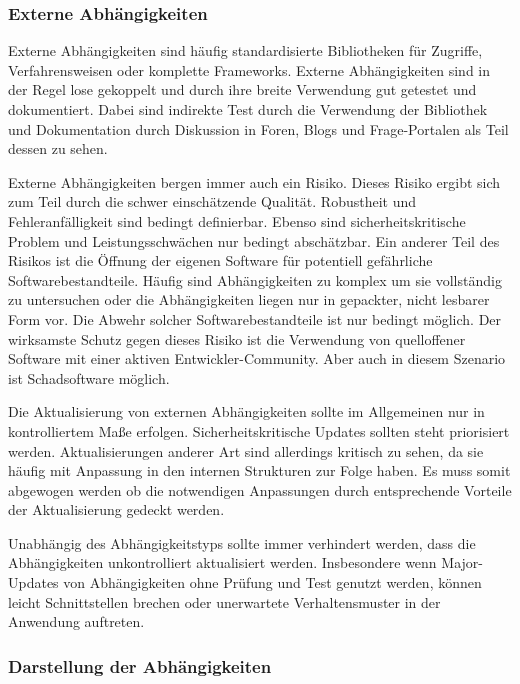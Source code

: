 \subsubsection{Externe Abhängigkeiten}

Externe Abhängigkeiten sind häufig standardisierte Bibliotheken für Zugriffe, Verfahrensweisen oder komplette Frameworks. Externe Abhängigkeiten sind in der Regel lose gekoppelt und durch ihre breite Verwendung gut getestet und dokumentiert. Dabei sind indirekte Test durch die Verwendung der Bibliothek und Dokumentation durch Diskussion in Foren, Blogs und Frage-Portalen als Teil dessen zu sehen. 

Externe Abhängigkeiten bergen immer auch ein Risiko. Dieses Risiko ergibt sich zum Teil durch die schwer einschätzende Qualität. Robustheit und Fehleranfälligkeit sind bedingt definierbar. Ebenso sind sicherheitskritische Problem und Leistungsschwächen nur bedingt abschätzbar. Ein anderer Teil des Risikos ist die Öffnung der eigenen Software für potentiell gefährliche Softwarebestandteile. Häufig sind Abhängigkeiten zu komplex um sie vollständig zu untersuchen oder die Abhängigkeiten liegen nur in gepackter, nicht lesbarer Form vor. Die Abwehr solcher Softwarebestandteile ist nur bedingt möglich. Der wirksamste Schutz gegen dieses Risiko ist die Verwendung von quelloffener Software mit einer aktiven Entwickler-Community. Aber auch in diesem Szenario ist Schadsoftware möglich.

Die Aktualisierung von externen Abhängigkeiten sollte im Allgemeinen nur in kontrolliertem Maße erfolgen. Sicherheitskritische Updates sollten steht priorisiert werden. Aktualisierungen anderer Art sind allerdings kritisch zu sehen, da sie häufig mit Anpassung in den internen Strukturen zur Folge haben. Es muss somit abgewogen werden ob die notwendigen Anpassungen durch entsprechende Vorteile der Aktualisierung gedeckt werden.

Unabhängig des Abhängigkeitstyps sollte immer verhindert werden, dass die Abhängigkeiten unkontrolliert aktualisiert werden. Insbesondere wenn Major-Updates von Abhängigkeiten ohne Prüfung und Test genutzt werden, können leicht Schnittstellen brechen oder unerwartete Verhaltensmuster in der Anwendung auftreten.

\subsubsection{Darstellung der Abhängigkeiten}
\label{subsubsec:illustrate-dependencies}

